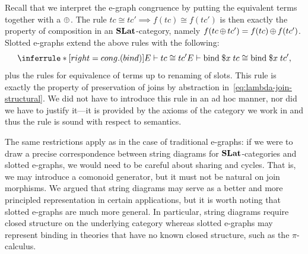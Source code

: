   Recall that we interpret the e-graph congruence by putting the equivalent terms together with a $\operatorname{\oplus}$.
  The rule $tc \cong tc' \implies f(tc) \cong f(tc')$ is then exactly the property of composition in an $\mathbf{SLat}$-category, namely $f(tc \operatorname{\oplus} tc') = f(tc) \operatorname{\oplus} f(tc')$.
	Slotted e-graphs extend the above rules with the following:
	\begin{equation}%
		\label{eq:cong-bind}
		\inferrule*[right=cong. (bind)]
		{E \vdash tc \cong tc'}
		{E \vdash \text{bind}\; \$x\; tc \cong \text{bind}\; \$x\; tc'},
	\end{equation}
	plus the rules for equivalence of terms up to renaming of slots.
  This rule is exactly the property of preservation of joins by abstraction in~\eqref{eq:lambda-join-structural}.
  We did not have to introduce this rule in an ad hoc manner, nor did we have to justify it---it is provided by the axioms of the category we work in and thus the rule is sound with respect to semantics.

  The same restrictions apply as in the case of traditional e-graphs: if we were to draw a precise correspondence between string diagrams for $\mathbf{SLat}$-categories and slotted e-graphs, we would need to be careful about sharing and cycles.
  That is, we may introduce a comonoid generator, but it must not be natural on join morphisms.
  We argued that string diagrams may serve as a better and more principled representation in certain applications, but it is worth noting that slotted e-graphs are much more general.
  In particular, string diagrams require closed structure on the underlying category whereas slotted e-graphs may represent binding in theories that have no known closed structure, such as the $\pi$-calculus.



